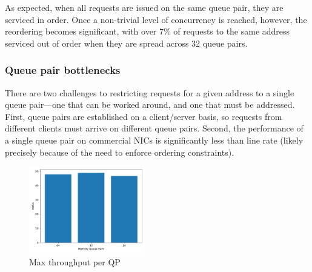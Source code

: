 As expected, when all requests are issued on the same queue pair, they are
serviced in order.  Once a non-trivial level of concurrency is reached, however,
the reordering becomes significant, with over 7\% of requests to the same
address serviced out of order when they are spread across 32 queue
pairs.


\subsubsection{Queue pair bottlenecks}

 There are two challenges to restricting requests for a given address
 to a single queue pair---one that can be worked around, and one that
 must be addressed.  First, queue pairs are established on a
 client/server basis, so requests from different clients must arrive
 on different queue pairs.  Second, the performance of a single queue
 pair on commercial NICs is significantly less than line rate (likely
 precisely because of the need to enforce ordering constraints).

\begin{figure}[t]
    \includegraphics[width=0.45\textwidth]{fig/qp_bottleneck.pdf}
    \caption{Max throughput per QP }
    \label{fig:qp_bottleneck}
\end{figure}